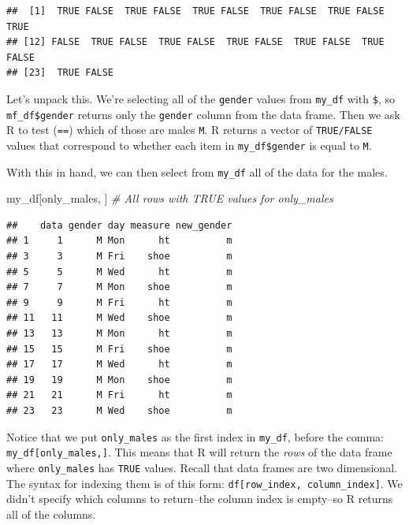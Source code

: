 \documentclass[]{article}
\newenvironment{Shaded}{\begin{snugshade}}{\end{snugshade}}
\newcommand{\StringTok}[1]{\textcolor[rgb]{0.31,0.60,0.02}{#1}}
\newcommand{\CommentTok}[1]{\textcolor[rgb]{0.56,0.35,0.01}{\textit{#1}}}
\newcommand{\OperatorTok}[1]{\textcolor[rgb]{0.81,0.36,0.00}{\textbf{#1}}}
\newcommand{\NormalTok}[1]{#1}
\begin{document}
\begin{Shaded}
\end{Shaded}

\begin{verbatim}
##  [1]  TRUE FALSE  TRUE FALSE  TRUE FALSE  TRUE FALSE  TRUE FALSE  TRUE
## [12] FALSE  TRUE FALSE  TRUE FALSE  TRUE FALSE  TRUE FALSE  TRUE FALSE
## [23]  TRUE FALSE
\end{verbatim}

Let's unpack this. We're selecting all of the \texttt{gender} values
from \texttt{my\_df} with \texttt{\$}, so \texttt{mf\_df\$gender}
returns only the \texttt{gender} column from the data frame. Then we ask
R to test (\texttt{==}) which of those are males
\texttt{\textquotesingle{}M\textquotesingle{}}. R returns a vector of
\texttt{TRUE/FALSE} values that correspond to whether each item in
\texttt{my\_df\$gender} is equal to \texttt{M}.

With this in hand, we can then select from \texttt{my\_df} all of the
data for the males.

\begin{Shaded}
\begin{Highlighting}[]
\NormalTok{my_df[only_males, ]  }\CommentTok{# All rows with TRUE values for only_males}
\end{Highlighting}
\end{Shaded}

\begin{verbatim}
##    data gender day measure new_gender
## 1     1      M Mon      ht          m
## 3     3      M Fri    shoe          m
## 5     5      M Wed      ht          m
## 7     7      M Mon    shoe          m
## 9     9      M Fri      ht          m
## 11   11      M Wed    shoe          m
## 13   13      M Mon      ht          m
## 15   15      M Fri    shoe          m
## 17   17      M Wed      ht          m
## 19   19      M Mon    shoe          m
## 21   21      M Fri      ht          m
## 23   23      M Wed    shoe          m
\end{verbatim}

Notice that we put \texttt{only\_males} as the first index in
\texttt{my\_df}, before the comma: \texttt{my\_df{[}only\_males,{]}}.
This means that R will return the \emph{rows} of the data frame where
\texttt{only\_males} has \texttt{TRUE} values. Recall that data frames
are two dimensional. The syntax for indexing them is of this form:
\texttt{df{[}row\_index,\ column\_index{]}}. We didn't specify which
columns to return--the column index is empty--so R returns all of the
columns.
\end{document}
